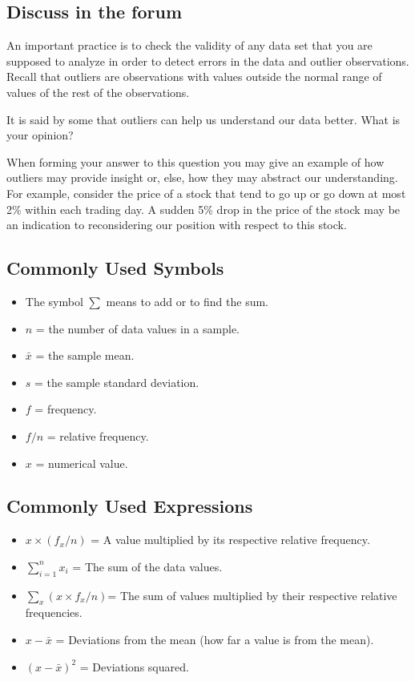 \documentclass[
]{krantz}
\theoremstyle{definition}
\theoremstyle{definition}
\theoremstyle{definition}
\theoremstyle{remark}
\begin{document}
\hypertarget{discuss-in-the-forum}{%
\subsection*{Discuss in the forum}\label{discuss-in-the-forum}}


An important practice is to check the validity of any data set that you
are supposed to analyze in order to detect errors in the data and
outlier observations. Recall that outliers are observations with values
outside the normal range of values of the rest of the observations.

It is said by some that outliers can help us understand our data better.
What is your opinion?

When forming your answer to this question you may give an example of how
outliers may provide insight or, else, how they may abstract our
understanding. For example, consider the price of a stock that tend to
go up or go down at most 2\% within each trading day. A sudden 5\% drop in
the price of the stock may be an indication to reconsidering our
position with respect to this stock.

\hypertarget{commonly-used-symbols}{%
\subsection*{Commonly Used Symbols}\label{commonly-used-symbols}}


\begin{itemize}
\item
  The symbol \(\sum\) means to add or to find the sum.
\item
  \(n\) = the number of data values in a sample.
\item
  \(\bar x\) = the sample mean.
\item
  \(s\) = the sample standard deviation.
\item
  \(f\) = frequency.
\item
  \(f/n\) = relative frequency.
\item
  \(x\) = numerical value.
\end{itemize}

\hypertarget{commonly-used-expressions}{%
\subsection*{Commonly Used Expressions}\label{commonly-used-expressions}}


\begin{itemize}
\item
  \(x \times (f_x/n)\) = A value multiplied by its respective relative
  frequency.
\item
  \(\sum_{i=1}^n x_i\) = The sum of the data values.
\item
  \(\sum_x (x \times f_x/n)\)= The sum of values multiplied by their
  respective relative frequencies.
\item
  \(x - \bar x\) = Deviations from the mean (how far a value is from the
  mean).
\item
  \((x - \bar x)^2\) = Deviations squared.
\end{itemize}
\end{document}
